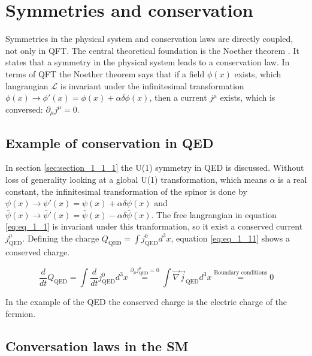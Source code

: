 \section{Symmetries and conservation}
\label{sec:section_1_2}

Symmetries in the physical system and conservation laws are directly coupled, not only in \acs{QFT}. The central theoretical foundation is the Noether theorem \cite{NOTHERTHEOREM}. It states that a symmetry in the physical system leads to a conservation law. In terms of \acs{QFT} the Noether theorem says that if a field $\phi(x)$ exists, which langrangian $\mathcal{L}$ is invariant under the infinitesimal transformation $\phi(x) \rightarrow \phi'(x) = \phi(x) + \alpha \delta \phi(x)$, then a current $j^{\mu}$ exists, which is conversed: $\partial_{\mu}j^{\mu} = 0$.  

\subsection{Example of conservation in \acs{QED}}
\label{sec:section_1_2_1}

In section \ref{sec:section_1_1_1} the U(1) symmetry in \acs{QED} is discussed. Without loss of generality looking at a global U(1) transformation, which means $\alpha$ is a real constant, the infinitesimal transformation of the spinor is done by $\psi(x) \rightarrow \psi'(x) = \psi(x) + \alpha \delta \psi(x)$ and  $\bar{\psi}(x) \rightarrow \bar{\psi}'(x) = \bar{\psi}(x) - \alpha \delta \bar{\psi}(x)$. The free langrangian in equation \ref{eq:eq_1_1} is invariant under this tranformation, so it exist a conserved current $j_{\text{QED}}^{\mu}$. Defining the charge $Q_{\text{QED}} = \int j^{0}_{\text{QED}} d^{3}x$, equation \ref{eq:eq_1_11} shows a conserved charge. 

\begin{equation}
	\label{eq:eq_1_11}
	\frac{d}{dt} Q_{\text{QED}} = \int \frac{d}{dt}j^{0}_{\text{QED}}d^{3}x \overset{\partial_{\mu}j_{\text{QED}}^{\mu} = 0}{=} \int \vec{\nabla} \vec{j}_{\text{QED}}d^{3}x \overset{\text{Boundary conditions}}{=} 0
\end{equation}

In the example of the \acs{QED} the conserved charge is the electric charge of the fermion.

\subsection{Conversation laws in the \acs{SM}}
\label{sec:section_1_2_2}

